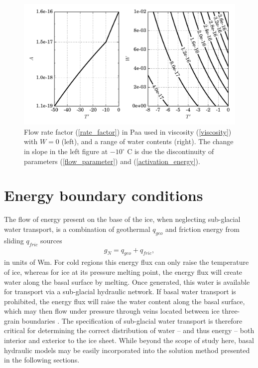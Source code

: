 \begin{figure}
  \centering
    \includegraphics[width=\linewidth]{images/internal_energy/rate_factor_new.pdf}
  \caption[Flow-rate-factor diagram]{Flow rate factor (\ref{rate_factor}) in Paa used in viscosity (\ref{viscosity}) with $W=0$ (left), and a range of water contents (right).  The change in slope in the left figure at $-10^\circ$ C is due the discontinuity of parameters (\ref{flow_parameter}) and (\ref{activation_energy}).}
  \label{rate_factor_image}
\end{figure}



\section{Energy boundary conditions} \label{ssn_energy_boundary_conditions}

The flow of energy present on the base of the ice, when neglecting sub-glacial water transport, is a combination of geothermal $q_{geo}$ and friction energy from sliding $q_{fric}$ sources
\begin{align}
  \label{basal_energy_source}
  g_N = q_{geo} + q_{fric},
\end{align}
in units of Wm.  For cold regions this energy flux can only raise the temperature of ice, whereas for ice at its pressure melting point, the energy flux will create water along the basal surface by melting.  Once generated, this water is available for transport via a sub-glacial hydraulic network.  If basal water transport is prohibited, the energy flux will raise the water content along the basal surface, which may then flow under pressure through veins located between ice three-grain boundaries \citep{nye_1973, shreve_1972, raymond_1975, lliboutry_1996}.  The specification of sub-glacial water transport is therefore critical for determining the correct distribution of water -- and thus energy -- both interior and exterior to the ice sheet.  While beyond the scope of study here, basal hydraulic models may be easily incorporated into the solution method presented in the following sections.

